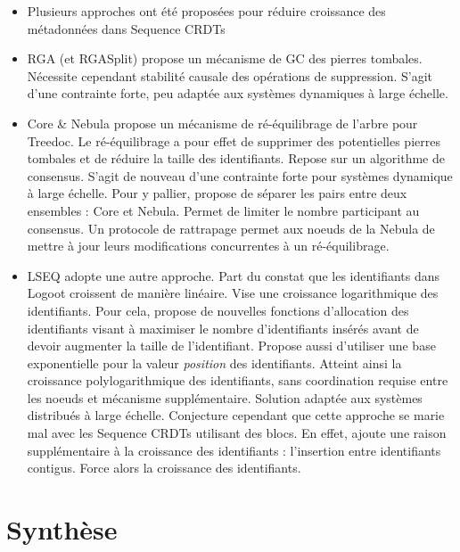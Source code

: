 \documentclass[12pt]{thesul}
\begin{document}
\begin{itemize}
  \item Plusieurs approches ont été proposées pour réduire croissance des métadonnées dans Sequence \acp{CRDT}
  \item \ac{RGA} (et RGASplit) propose un mécanisme de GC des pierres tombales.
    Nécessite cependant stabilité causale des opérations de suppression.
    S'agit d'une contrainte forte, peu adaptée aux systèmes dynamiques à large échelle.
  \item Core \& Nebula propose un mécanisme de ré-équilibrage de l'arbre pour Treedoc.
    Le ré-équilibrage a pour effet de supprimer des potentielles pierres tombales et de réduire la taille des identifiants.
    Repose sur un algorithme de consensus.
    S'agit de nouveau d'une contrainte forte pour systèmes dynamique à large échelle.
    Pour y pallier, propose de séparer les pairs entre deux ensembles : Core et Nebula.
    Permet de limiter le nombre participant au consensus.
    Un protocole de rattrapage permet aux noeuds de la Nebula de mettre à jour leurs modifications concurrentes à un ré-équilibrage.
  \item LSEQ adopte une autre approche.
    Part du constat que les identifiants dans Logoot croissent de manière linéaire.
    Vise une croissance logarithmique des identifiants.
    Pour cela, propose de nouvelles fonctions d'allocation des identifiants visant à maximiser le nombre d'identifiants insérés avant de devoir augmenter la taille de l'identifiant.
    Propose aussi d'utiliser une base exponentielle pour la valeur \emph{position} des identifiants.
    Atteint ainsi la croissance polylogarithmique des identifiants, sans coordination requise entre les noeuds et mécanisme supplémentaire.
    Solution adaptée aux systèmes distribués à large échelle.
    Conjecture cependant que cette approche se marie mal avec les Sequence \acp{CRDT} utilisant des blocs.
    En effet, ajoute une raison supplémentaire à la croissance des identifiants : l'insertion entre identifiants contigus.
    Force alors la croissance des identifiants.
\end{itemize}

\section{Synthèse}
\end{document}
